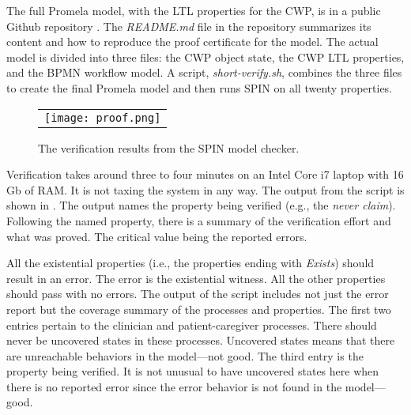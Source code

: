 The full Promela model, with the LTL properties for the CWP, is in a public Github repository \cite{repo}. The \emph{README.md} file in the repository summarizes its content and how to reproduce the proof certificate for the model. The actual model is divided into three files: the CWP object state, the CWP LTL properties, and the BPMN workflow model. A script, \emph{short-verify.sh}, combines the three files to create the final Promela model and then runs SPIN on all twenty properties.

\begin{figure}
  \begin{center}
    \begin{tabular}{c}
      \texttt{[image: proof.png]}
    \end{tabular}
  \end{center}
\caption{The verification results from the SPIN model checker.}
\label{fig:proof}
\end{figure}

Verification takes around three to four minutes on an Intel Core i7 laptop with 16 Gb of RAM. It is not taxing the system in any way. The output from the script is shown in . The output names the property being verified (e.g., the \emph{never claim}). Following the named property, there is a  summary of the verification effort and what was proved. The critical value being the reported errors.

All the existential properties (i.e., the properties ending with \emph{Exists}) should result in an error. The error is the existential witness. All the other properties should pass with no errors. The output of the script includes not just the error report but the coverage summary of the processes and properties. The first two entries pertain to the clinician and patient-caregiver processes. There should never be uncovered states in these processes. Uncovered states means that there are unreachable behaviors in the model---not good. The third entry is the property being verified. It is not unusual to have uncovered states here when there is no reported error since the error behavior is not found in the model---good.